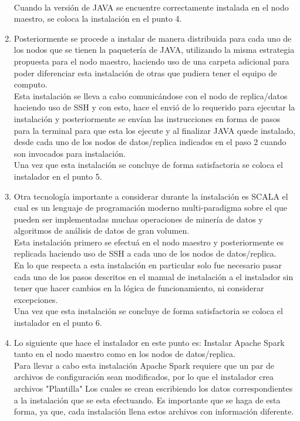 \begin{enumerate}
	\\ 
	Cuando la versión de JAVA se encuentre correctamente instalada en el nodo maestro, se coloca la instalación en el punto 4.
	\item Posteriormente se procede a instalar de manera distribuida para cada uno de los nodos que se tienen la paquetería de JAVA, utilizando la misma estrategia propuesta para el nodo maestro, haciendo uso de una carpeta adicional para poder diferenciar esta instalación de otras que pudiera tener el equipo de computo. \\
	Esta instalación se lleva a cabo comunicándose con el nodo de replica/datos haciendo uso de SSH y con esto, hace el envió de lo requerido para ejecutar la instalación y posteriormente se envían las instrucciones en forma de pasos para la terminal para que esta los ejecute y al finalizar JAVA quede instalado, desde cada uno de los nodos de datos/replica indicados en el paso 2 cuando son invocados para instalación.\\
	Una vez que esta instalación se concluye de forma satisfactoria se coloca el instalador en el punto 5.
	\item Otra tecnología importante a considerar durante la instalación es SCALA el cual es un lenguaje de programación moderno multi-paradigma sobre el que pueden ser implementadas muchas operaciones de minería de datos y algoritmos de análisis de datos de gran volumen.\\
	Esta instalación primero se efectuá en el nodo maestro y posteriormente es replicada haciendo uso de SSH a cada uno de los nodos de datos/replica. \\
	En lo que respecta a esta instalación en particular solo fue necesario pasar cada uno de los pasos descritos en el manual de instalación a el instalador sin tener que hacer cambios en la lógica de funcionamiento, ni considerar excepciones. \\
	Una vez que esta instalación se concluye de forma satisfactoria se coloca el instalador en el punto 6.
	\item Lo siguiente que hace el instalador en este punto es: Instalar Apache Spark tanto en el nodo maestro como en los nodos de datos/replica.\\
	Para llevar a cabo esta instalación Apache Spark requiere que un par de archivos de configuración sean modificados, por lo que el instalador crea archivos "Plantilla" Los cuales se crean escribiendo los datos correspondientes a la instalación que se esta efectuando. Es importante que se haga de esta forma, ya que, cada instalación llena estos archivos con información diferente.\\

\end{enumerate}
